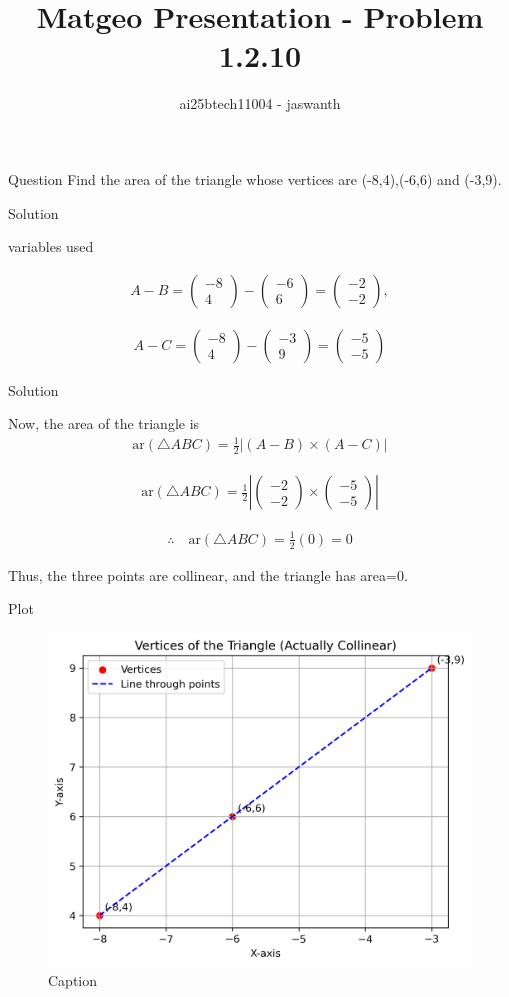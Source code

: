 \documentclass{beamer}
\title{Matgeo Presentation - Problem 1.2.10}
\author{ai25btech11004 - jaswanth}
\numberwithin{equation}{section}
\theoremstyle{remark}
\newcommand{\myvec}[1]{\ensuremath{\begin{pmatrix}#1\end{pmatrix}}}
\begin{document}
\frame{\titlepage}
\begin{frame}{Question}
Find the area of the triangle whose vertices are (-8,4),(-6,6) and (-3,9).
\end{frame}

\begin{frame}{Solution}

\begin{table}[h!]
	\centering
	
	\caption{variables used}
	\label{}
\end{table}
\begin{align}
A-B = \myvec{-8 \\ 4} - \myvec{-6 \\ 6} 
= \myvec{-2 \\ -2},
\end{align}

\begin{align}
A-C = \myvec{-8 \\ 4} - \myvec{-3 \\ 9} 
= \myvec{-5 \\ -5}
\end{align}

\end{frame}
\begin{frame}{Solution}

Now, the area of the triangle is
\begin{align}
 \text{ar}(\triangle ABC) 
= \frac{1}{2} \left| (A-B) \times (A-C) \right|   
\end{align}

\begin{align}
 \text{ar}(\triangle ABC)=  \frac{1}{2} \left| \myvec{-2 \\ -2} \times  \myvec{-5 \\ -5} \right |
\end{align}



\begin{align}
\therefore \quad \text{ar}(\triangle ABC) = \frac{1}{2}(0) = 0
\end{align}


\noindent
Thus, the three points are collinear, and the triangle has area=0.
\end{frame}
\begin{frame}{Plot}
\begin{figure}[h]
    \centering
    \includegraphics[width=0.5\linewidth]{figs/01.png}
    \caption{Caption}
    \label{fig:placeholder}
\end{figure}
\end{frame}
\end{document}
